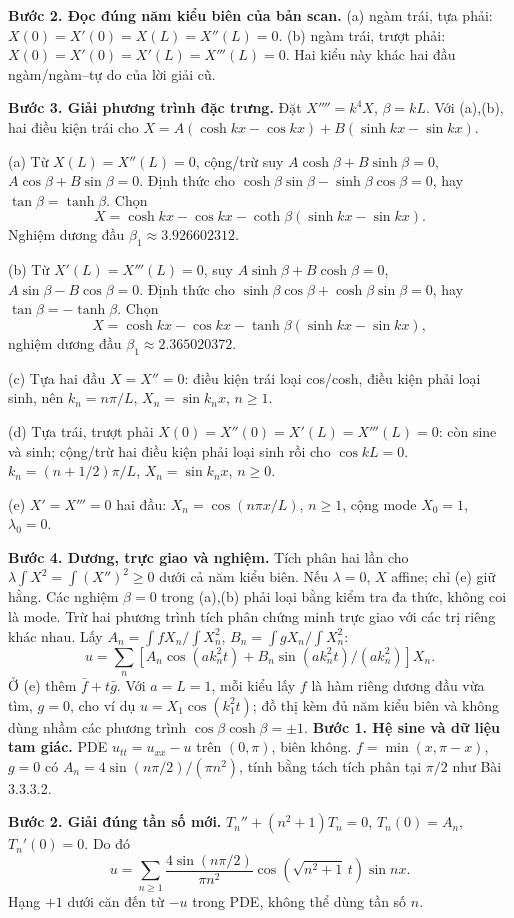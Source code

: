 \textbf{Bước 2. Đọc đúng năm kiểu biên của bản scan.} (a) ngàm trái, tựa phải: $X(0)=X'(0)=X(L)=X''(L)=0$. (b) ngàm trái, trượt phải: $X(0)=X'(0)=X'(L)=X'''(L)=0$. Hai kiểu này khác hai đầu ngàm/ngàm–tự do của lời giải cũ.

\textbf{Bước 3. Giải phương trình đặc trưng.} Đặt $X''''=k^4X$, $\beta=kL$. Với (a),(b), hai điều kiện trái cho $X=A(\cosh kx-\cos kx)+B(\sinh kx-\sin kx)$.

(a) Từ $X(L)=X''(L)=0$, cộng/trừ suy $A\cosh\beta+B\sinh\beta=0$, $A\cos\beta+B\sin\beta=0$. Định thức cho $\cosh\beta\sin\beta-\sinh\beta\cos\beta=0$, hay $\tan\beta=\tanh\beta$. Chọn
\[X=\cosh kx-\cos kx-\coth\beta(\sinh kx-\sin kx).\]
Nghiệm dương đầu $\beta_1\approx3.926602312$.

(b) Từ $X'(L)=X'''(L)=0$, suy $A\sinh\beta+B\cosh\beta=0$, $A\sin\beta-B\cos\beta=0$. Định thức cho $\sinh\beta\cos\beta+\cosh\beta\sin\beta=0$, hay $\tan\beta=-\tanh\beta$. Chọn
\[X=\cosh kx-\cos kx-\tanh\beta(\sinh kx-\sin kx),\]
nghiệm dương đầu $\beta_1\approx2.365020372$.

(c) Tựa hai đầu $X=X''=0$: điều kiện trái loại cos/cosh, điều kiện phải loại sinh, nên $k_n=n\pi/L$, $X_n=\sin k_nx$, $n\ge1$.

(d) Tựa trái, trượt phải $X(0)=X''(0)=X'(L)=X'''(L)=0$: còn sine và sinh; cộng/trừ hai điều kiện phải loại sinh rồi cho $\cos kL=0$. $k_n=(n+1/2)\pi/L$, $X_n=\sin k_nx$, $n\ge0$.

(e) $X'=X'''=0$ hai đầu: $X_n=\cos(n\pi x/L)$, $n\ge1$, cộng mode $X_0=1$, $\lambda_0=0$.

\textbf{Bước 4. Dương, trực giao và nghiệm.} Tích phân hai lần cho $\lambda\int X^2=\int(X'')^2\ge0$ dưới cả năm kiểu biên. Nếu $\lambda=0$, $X$ affine; chỉ (e) giữ hằng. Các nghiệm $\beta=0$ trong (a),(b) phải loại bằng kiểm tra đa thức, không coi là mode. Trừ hai phương trình tích phân chứng minh trực giao với các trị riêng khác nhau. Lấy $A_n=\int fX_n/\int X_n^2$, $B_n=\int gX_n/\int X_n^2$:
\[u=\sum_n[A_n\cos(ak_n^2t)+B_n\sin(ak_n^2t)/(ak_n^2)]X_n.\]
Ở (e) thêm $\bar f+t\bar g$. Với $a=L=1$, mỗi kiểu lấy $f$ là hàm riêng dương đầu vừa tìm, $g=0$, cho ví dụ $u=X_1\cos(k_1^2t)$; đồ thị kèm đủ năm kiểu biên và không dùng nhầm các phương trình $\cos\beta\cosh\beta=\pm1$.
\textbf{Bước 1. Hệ sine và dữ liệu tam giác.} PDE $u_{tt}=u_{xx}-u$ trên $(0,\pi)$, biên không. $f=\min(x,\pi-x)$, $g=0$ có $A_n=4\sin(n\pi/2)/(\pi n^2)$, tính bằng tách tích phân tại $\pi/2$ như Bài 3.3.3.2.

\textbf{Bước 2. Giải đúng tần số mới.} $T_n''+(n^2+1)T_n=0$, $T_n(0)=A_n$, $T_n'(0)=0$. Do đó
\[u=\sum_{n\ge1}\frac{4\sin(n\pi/2)}{\pi n^2}\cos(\sqrt{n^2+1}\,t)\sin nx.\]
Hạng $+1$ dưới căn đến từ $-u$ trong PDE, không thể dùng tần số $n$.

